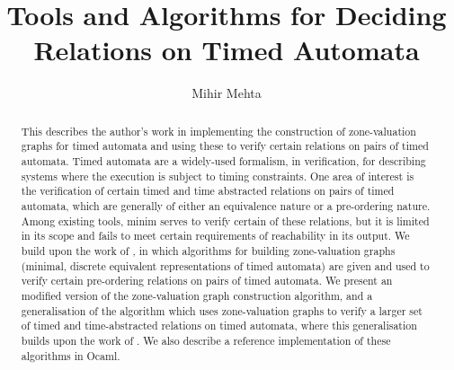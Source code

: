 \documentclass[a4paper]{book}
\begin{document}
\mainmatter

\title{Tools and Algorithms for Deciding Relations on Timed Automata}

\author{Mihir Mehta}



\maketitle

\begin{abstract}
  This describes the author's work in implementing the construction of
  zone-valuation graphs for timed automata and using these to verify
  certain relations on pairs of timed automata.
  Timed automata are a widely-used formalism, in verification, for
  describing systems where the execution is subject to timing
  constraints. One area of interest is the verification of certain
  timed and time abstracted relations on pairs of timed automata,
  which are generally of either an equivalence nature or a
  pre-ordering nature. Among existing tools, minim
  \cite{tripakis2001analysis} serves to verify certain of these
  relations, but it is limited in its scope and fails to meet certain
  requirements of reachability in its output. We build upon the work
  of \cite{DBLP:conf/cav/GuhaNA12}, in which algorithms for building
  zone-valuation graphs (minimal, discrete equivalent representations
  of timed automata) are given and used to verify certain pre-ordering
  relations on pairs of timed automata. We present an modified version
  of the zone-valuation graph construction algorithm, and a
  generalisation of the algorithm which uses zone-valuation graphs to
  verify a larger set of timed and time-abstracted relations on timed
  automata, where this generalisation builds upon the work of
  \cite{arun2006bisimilarities}. We also describe a reference
  implementation of these algorithms in Ocaml.
\end{abstract}
\pagebreak
\end{document}
